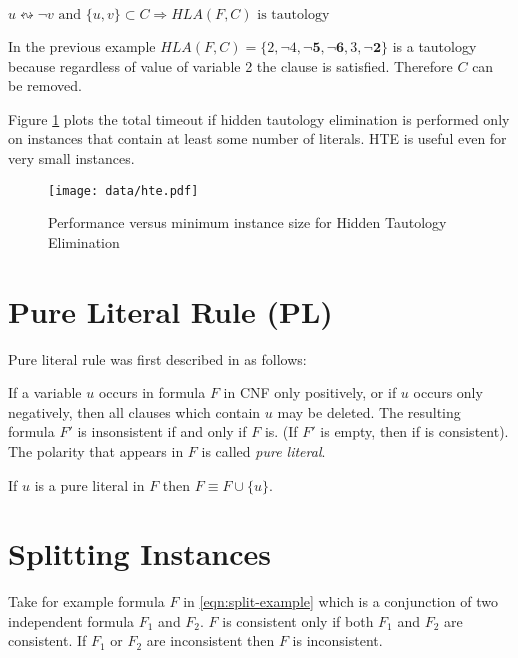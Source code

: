 \begin{myprop}
  $u \leftrightsquigarrow \neg v \text{ and } \{ u, v \} \subset C \Rightarrow HLA(F,
  C) \text{ is tautology}$
\end{myprop}

In the previous example $HLA(F, C) = \{2, \neg 4, \mathbf{\neg 5,
\neg 6}, 3, \mathbf{\neg 2} \}$ is a tautology because regardless
of value of variable 2 the clause is satisfied. Therefore $C$
can be removed.

Figure \ref{fig:hte} plots the total timeout if hidden tautology elimination is
performed only on instances that contain at least some number of
literals. HTE is useful even for very small instances.

\begin{figure}[h]
  \texttt{[image: data/hte.pdf]}
  \caption{Performance versus minimum instance size for Hidden Tautology Elimination}
  \label{fig:hte}
\end{figure}


\section{Pure Literal Rule (PL)}

Pure literal rule was first described in \cite{Davis:1960:CPQ:321033.321034}
as follows:

\begin{mydef}
  If a variable $u$ occurs in formula $F$ in CNF only positively, or
  if $u$ occurs only negatively, then all clauses which contain $u$
  may be deleted. The resulting formula $F'$ is insonsistent
  if and only if $F$ is. (If $F'$ is empty, then if is consistent).
  The polarity that appears in $F$ is called \emph{pure literal}.
\end{mydef}

\begin{myprop}
  If $u$ is a pure literal in $F$ then $F \equiv F \cup \{ u \}$.
\end{myprop}


\section{Splitting Instances}

Take for example formula $F$ in \ref{eqn:split-example} which is a conjunction of
two independent formula $F_1$ and $F_2$. $F$ is consistent only if
both $F_1$ and $F_2$ are consistent. If $F_1$ or $F_2$ are inconsistent
then $F$ is inconsistent.

